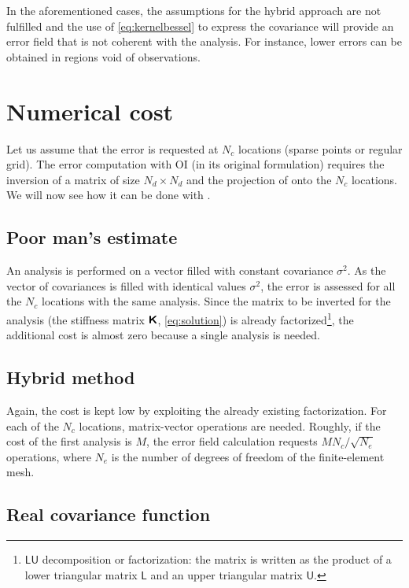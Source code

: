 In the aforementioned cases, the assumptions for the hybrid approach are not fulfilled and the use of \eqref{eq:kernelbessel} to express the covariance will provide an error field that is not coherent with the analysis. For instance, lower errors can be obtained in regions void of observations. 

\section{Numerical cost}

Let us assume that the error is requested at $N_{c}$ locations (sparse points or regular grid). The error computation with OI (in its original formulation) requires the inversion of a matrix of size $N_{d} \times N_{d}$ and the projection of onto the $N_{c}$ locations. We will now see how it can be done with \diva.

\subsection{Poor man's estimate}

An analysis is performed on a vector filled with constant covariance $\sigma^{2}$. As the vector of covariances is filled with identical values $\sigma^{2}$, the error is assessed for all the $N_{c}$ locations with the same analysis. Since the matrix to be inverted for the analysis (the stiffness matrix $\mbox{\boldmath $ \protect\mathsf{K} $}$, \eqref{eq:solution}) is already factorized\footnote{$\mathsf{LU}$ decomposition or factorization: the matrix is written as the product of a lower triangular matrix $\mathsf{L}$ and an upper triangular matrix $\mathsf{U}$.}, the additional cost is almost zero because a single analysis is needed.   

\subsection{Hybrid method} 

Again, the cost is kept low by exploiting the already existing factorization. For each of the $N_c$ locations, matrix-vector operations are needed. Roughly, if the cost of the first analysis is $M$, the error field calculation requests $M N_c/\sqrt{N_e}$ operations, where $N_e$ is the number of degrees of freedom of the finite-element mesh.

\subsection{Real covariance function}

